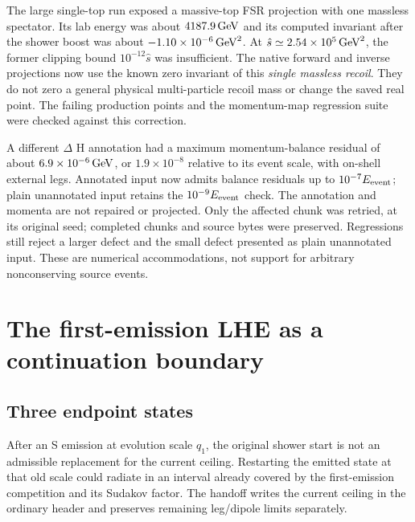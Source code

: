 The large single-top run exposed a massive-top FSR projection with
one massless spectator.
Its lab energy was about $4187.9\,\mathrm{GeV}$ and its computed invariant
after the shower boost was about $-1.10\times10^{-6}\,\mathrm{GeV}^2$.
At $\hat s\simeq2.54\times10^5\,\mathrm{GeV}^2$, the former clipping bound
$10^{-12}\hat s$ was insufficient.
The native forward and inverse projections now use the known
zero invariant of this \emph{single massless recoil}.
They do not zero a general physical multi-particle recoil mass
or change the saved real point.
The failing production points and the momentum-map regression
suite were checked against this correction.

A different $\Delta$ H annotation had a maximum momentum-balance
residual of about $6.9\times10^{-6}\,\mathrm{GeV}$, or $1.9\times10^{-8}$
relative to its event scale, with on-shell external legs.
Annotated input now admits balance residuals up to
$10^{-7}E_{\rm event}$; plain unannotated input retains the
$10^{-9}E_{\rm event}$ check.
The annotation and momenta are not repaired or projected.
Only the affected chunk was retried, at its original seed;
completed chunks and source bytes were preserved.
Regressions still reject a larger defect and the small defect
presented as plain unannotated input.
These are numerical accommodations, not support for arbitrary
nonconserving source events.

\section{The first-emission LHE as a continuation boundary}
\label{sec:masses-continuation}

\subsection{Three endpoint states}
\label{sec:masses-three-states}

After an S emission at evolution scale $q_1$, the original shower
start is not an admissible replacement for the current ceiling.
Restarting the emitted state at that old scale could radiate in an
interval already covered by the first-emission competition and its
Sudakov factor.
The handoff writes the current ceiling in the ordinary header
and preserves remaining leg/dipole limits separately.

